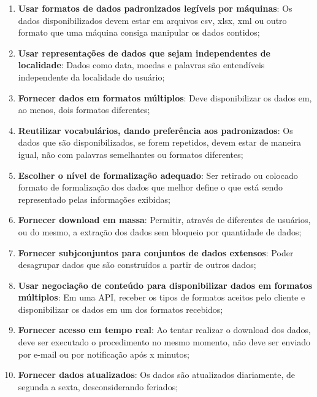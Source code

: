\begin{enumerate}
    \item \textbf{Usar formatos de dados padronizados legíveis por máquinas}: Os dados disponibilizados devem estar em arquivos csv, xlsx, xml ou outro formato que uma máquina consiga manipular os dados contidos;

    \item \textbf{Usar representações de dados que sejam independentes de localidade}: Dados como data, moedas e palavras são entendíveis independente da localidade do usuário;

    \item \textbf{Fornecer dados em formatos múltiplos}: Deve disponibilizar os dados em, ao menos, dois formatos diferentes;

    \item \textbf{Reutilizar vocabulários, dando preferência aos padronizados}: Os dados que são disponibilizados, se forem repetidos, devem estar de maneira igual, não com palavras semelhantes ou formatos diferentes;

    \item \textbf{Escolher o nível de formalização adequado}: Ser retirado ou colocado formato de formalização dos dados que melhor define o que está sendo representado pelas informações exibidas;

    \item \textbf{Fornecer download em massa}: Permitir, através de diferentes de usuários, ou do mesmo, a extração dos dados sem bloqueio por quantidade de dados;

    \item \textbf{Fornecer subjconjuntos para conjuntos de dados extensos}: Poder desagrupar dados que são construídos a partir de outros dados;

    \item \textbf{Usar negociação de conteúdo para disponibilizar dados em formatos múltiplos}: Em uma API, receber os tipos de formatos aceitos pelo cliente e disponibilizar os dados em um dos formatos recebidos;

    \item \textbf{Fornecer acesso em tempo real}: Ao tentar realizar o download dos dados, deve ser executado o procedimento no mesmo momento, não deve ser enviado por e-mail ou por notificação após x minutos;

    \item \textbf{Fornecer dados atualizados}: Os dados são atualizados diariamente, de segunda a sexta, desconsiderando feriados;


\end{enumerate}
